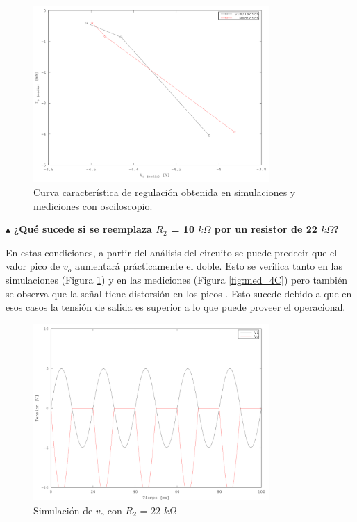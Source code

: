 \begin{figure}[H]
  \centering
      \includegraphics[width=0.8\textwidth]{gfxsantiago/FIG_Rectificador_Precision_Caracterisica_Regulacion.png}
  \caption{Curva característica de regulación obtenida en simulaciones y mediciones con osciloscopio.}
\end{figure}

\noindent$\blacktriangle$\textbf{ ¿Qué sucede si se reemplaza $R_2$ = 10 $k\Omega$ por un resistor de 22 $k\Omega$?}

En estas condiciones, a partir del análisis del circuito se puede predecir que el valor pico de $v_{o}$ aumentará prácticamente el doble. Esto se verifica tanto en las simulaciones (Figura \ref{fig:sim_4C}) y en las mediciones (Figura \ref{fig:med_4C}) pero también se observa que la señal tiene distorsión en los picos . Esto sucede debido a que en esos casos la tensión de salida es superior a lo que puede proveer el operacional.\\

\begin{figure}[H]
  \centering
      \includegraphics[width=0.8\textwidth]{gfxsantiago/FIG_SIM_Rectificador_Precision_4C.png}
  \caption{Simulación de $v_{o}$ con $R_{2}$ = 22 $k\Omega$}
  \label{fig:sim_4C}
\end{figure}

